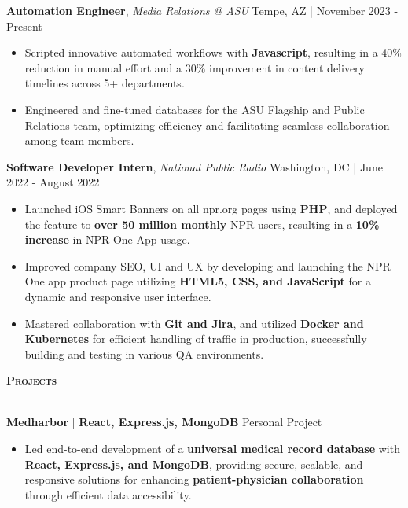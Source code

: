 \documentclass[10pt]{article}
\newcommand{\lineunder} {
    \vspace*{-8pt} \\
    \hspace*{-18pt} \hrulefill \\
}
\newcommand{\header} [1] {
    {\hspace*{-15pt}\vspace*{3pt} \textsc{#1}}
    \vspace*{-2pt} \lineunder
}
\begin{document}
\textbf{Automation Engineer}, \textit{Media Relations @ ASU} \hfill Tempe, AZ | November 2023 - Present\\
\vspace{-1mm}
\begin{itemize}[leftmargin=5mm, itemsep=0mm]

  \item Scripted innovative automated workflows with \textbf{Javascript}, resulting in a 40\% reduction in manual effort and a 30\% improvement in content delivery timelines across 5+ departments.
  \item Engineered and fine-tuned databases for the ASU Flagship and Public Relations team, optimizing efficiency and facilitating seamless collaboration among team members.
\end{itemize} 



\textbf{Software Developer Intern}, \textit{National Public Radio}     \hfill Washington, DC | June 2022 - August 2022\\
\vspace{-1mm}
\begin{itemize}[leftmargin=5mm, itemsep=0mm]
  
  \item Launched iOS Smart Banners on all npr.org pages using \textbf{PHP}, and deployed the feature to \textbf{over 50 million monthly} NPR users, resulting in a \textbf{10\% increase} in NPR One App usage.
  \item Improved company SEO, UI and UX by developing and launching the NPR One app product page utilizing \textbf{HTML5, CSS, and JavaScript} for a dynamic and responsive user interface.
  \item Mastered collaboration with \textbf{Git and Jira}, and utilized \textbf{Docker and Kubernetes} for efficient handling of traffic in production, successfully building and testing in various QA environments.
\end{itemize}


\header{\textbf{Projects}}
\vspace{0.5mm}

\textbf{Medharbor} | \textbf{React, Express.js, MongoDB} \hfill Personal Project \\
\vspace{-1mm}
\begin{itemize}[leftmargin=5mm, itemsep=0mm]
  \item Led end-to-end development of a \textbf{universal medical record database} with \textbf{React, Express.js, and MongoDB}, providing secure, scalable, and responsive solutions for enhancing \textbf{patient-physician collaboration} through efficient data accessibility.
\end{itemize}
\end{document}
